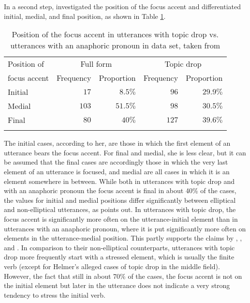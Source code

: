 In a second step, \citet[218]{helmer2016} investigated the position of the focus  accent and differentiated initial, medial, and final position, as shown in Table \ref{tab:helmer.focus}.

\begin{table}
\caption{Position of the focus accent in utterances with topic drop vs. utterances with an anaphoric pronoun in  data set, taken from \citet[218]{helmer2016}}
\centering
\begin{tabular}{lrrrr}
\lsptoprule
Position of & \multicolumn{2}{c}{Full form} & \multicolumn{2}{c}{Topic drop}  \\
focus accent & Frequency & Proportion & Frequency & Proportion  \\
\midrule
Initial  & $17$ & $8.5\%$ & $96$ & $29.9\%$ \\
Medial & $103$ & $51.5\%$  & $98$ & $30.5\%$ \\
Final & $80$ & $40\%$ & $127$ & $39.6\%$ \\
\lspbottomrule
\end{tabular}
\label{tab:helmer.focus}
\end{table}

\noindent
The initial cases, according to her, are those in which the first element of an utterance bears the focus accent. 
For final and medial, she is less clear, but it can be assumed that the final cases are accordingly those in which the very last element of an utterance is focused, and medial are all cases in which it is an element somewhere in between.
While both in utterances with topic drop and with an anaphoric pronoun the focus  accent is final in about 40\% of the cases, the values for initial and medial positions differ significantly between elliptical and non-elliptical utterances, as \citet[218]{helmer2016} points out.
In utterances with topic drop, the focus  accent is significantly more often on the utterance-initial element than in utterances with an anaphoric pronoun, where it is put significantly more often on elements in the utterance-medial position.
This partly supports the claims by \citet{auer1993}, \citet{sandig2000}, and \citet{guenthner2006}.
In comparison to their non-elliptical counterparts, utterances with topic drop more frequently start with a stressed element, which is usually the finite verb (except for Helmer's alleged cases of topic drop in the middle field).
However, the fact that still in about 70\% of the cases, the focus  accent is not on the initial element but later in the utterance does not indicate a very strong tendency to stress the initial verb.

